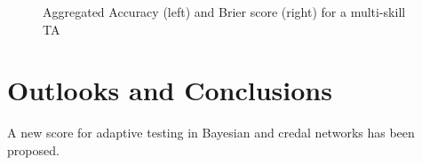 \documentclass[runningheads]{llncs}
\begin{document}
\begin{figure}[htp!]
\centering


\caption{Aggregated Accuracy (left) and Brier score (right) for a multi-skill TA}
\label{fig:multi}
\end{figure}

\section{Outlooks and Conclusions}\label{sec:conc}
A new score for adaptive testing in Bayesian and credal networks has been proposed.


\end{document}
